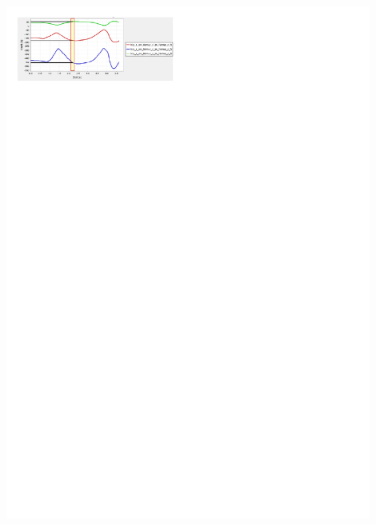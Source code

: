 		\begin{Figure}
			\centering
			\includegraphics[trim={0.5cm 25.25cm 11.25cm 0.5cm},clip,width=12cm]{content/opensim_hip_reaction_force.pdf}
			\label{fig:excel}
		\end{Figure}
	
